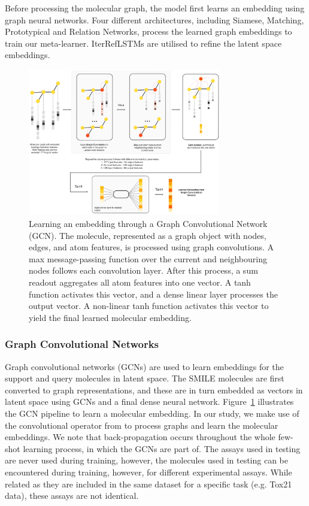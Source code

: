 Before processing the molecular graph, the model first learns an embedding using graph neural networks. Four different architectures, including Siamese, Matching, Prototypical and Relation Networks, process the learned graph embeddings to train our meta-learner. IterRefLSTMs are utilised to refine the latent space embeddings. 

\begin{figure}[ht!]
	\centering
	\includegraphics[width=0.75\textwidth]{img/DVGCNArchi.png}
	\caption{Learning an embedding through a Graph Convolutional Network (GCN). The molecule, represented as a graph object with nodes, edges, and atom features, is processed using graph convolutions. A max message-passing function over the current and neighbouring nodes follows each convolution layer. After this process, a sum readout aggregates all atom features into one vector. A tanh function activates this vector, and a dense linear layer processes the output vector. A non-linear tanh function activates this vector to yield the final learned molecular embedding.}
	\label{fig:dvgcnarchi}
\end{figure}

\subsubsection{Graph Convolutional Networks}

Graph convolutional networks (GCNs) are used to learn embeddings for the support and query molecules in latent space. The SMILE molecules are first converted to graph representations, and these are in turn embedded as vectors in latent space using GCNs and a final dense neural network. Figure~\ref{fig:dvgcnarchi} illustrates the GCN pipeline to learn a molecular embedding. In our study, we make use of the convolutional operator from \citet{kipf2016semi} to process graphs and learn the molecular embeddings. We note that back-propagation occurs throughout the whole few-shot learning process, in which the GCNs are part of. The assays used in testing are never used during training, however, the molecules used in testing can be encountered during training, however, for different experimental assays. While related as they are included in the same dataset for a specific task (e.g. Tox21 data), these assays are not identical.

